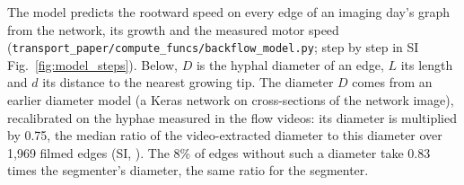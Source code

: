 The model predicts the rootward speed on every edge of an imaging day's graph from the network, its growth and the measured motor speed (\texttt{transport\_paper/compute\_funcs/backflow\_model.py}; step by step in SI Fig.~\ref{fig:model_steps}).
Below, $D$ is the hyphal diameter of an edge, $L$ its length and $d$ its distance to the nearest growing tip.
The diameter $D$ comes from an earlier diameter model (a Keras network on cross-sections of the network image), recalibrated on the hyphae measured in the flow videos: its diameter is multiplied by 0.75, the median ratio of the video-extracted diameter to this diameter over 1,969 filmed edges (SI, ).
The 8\% of edges without such a diameter take 0.83 times the segmenter's diameter, the same ratio for the segmenter.
